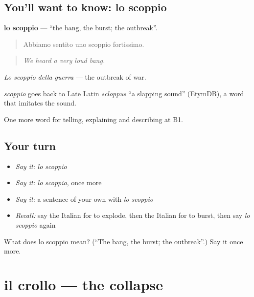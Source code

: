 \subsection*{You'll want to know: lo scoppio}
\textbf{lo scoppio} — \textquotedblleft{}the bang, the burst; the outbreak\textquotedblright{}.

\begin{quote}
Abbiamo sentito uno scoppio fortissimo.
\end{quote}

\begin{quote}
\emph{We heard a very loud bang.}
\end{quote}

\emph{Lo scoppio della guerra} — the outbreak of war.

\begin{cousinweb}
\emph{scoppio} goes back to Late Latin \emph{scloppus} \textquotedblleft{}a slapping sound\textquotedblright{} (EtymDB), a word that imitates the sound.
\end{cousinweb}

\begin{grammarlens}[title={What you've built}]
One more word for telling, explaining and describing at B1.
\end{grammarlens}

\subsection*{Your turn}
\begin{itemize}
\raggedright
  \item \emph{Say it:} \emph{lo scoppio}
  \item \emph{Say it:} \emph{lo scoppio}, once more
  \item \emph{Say it:} a sentence of your own with \emph{lo scoppio}
  \item \emph{Recall:} say the Italian for to explode, then the Italian for to burst, then say \emph{lo scoppio} again
\end{itemize}

\begin{tcolorbox}[breakable,colback=teal!4,colframe=teal!35!black,title={Before you move on}]
What does lo scoppio mean? (\textquotedblleft{}The bang, the burst; the outbreak\textquotedblright{}.) Say it once more.
\end{tcolorbox}
\section[il crollo]{il crollo — the collapse}

